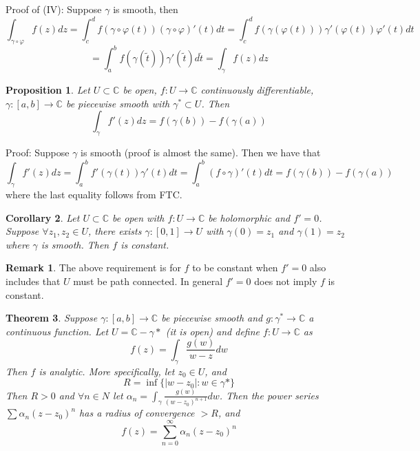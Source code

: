 \documentclass[11pt]{article}
\theoremstyle{plain}
\newtheorem{theorem}{Theorem}[section]
\newtheorem{corollary}[theorem]{Corollary}
\newtheorem{proposition}[theorem]{Proposition}
\theoremstyle{definition}
\newtheorem{remark}{Remark}
\newcommand{\C}{\mathbb{C}}
\begin{document}
Proof of (IV): Suppose $\gamma$ is smooth, then 
$$ \int_{\gamma \circ \varphi} f(z)dz = \int_{c}^d f(\gamma \circ \varphi(t)) (\gamma \circ \varphi)'(t)dt = \int_c^d f(\gamma(\varphi(t))) \gamma'(\varphi(t)) \varphi'(t)dt $$
$$ = \int_a^b f(\gamma(\tilde{t})) \gamma'(\tilde{t})d\tilde{t} = \int_{\gamma} f(z)dz $$

\begin{proposition}
Let $U \subset \mathbb{C}$ be open, $f: U \to \C$ continuously differentiable, $\gamma : [a, b] \to \C$ be piecewise smooth with $\gamma^* \subset U$. Then 
$$ \int_{\gamma} f'(z)dz = f(\gamma(b)) - f(\gamma(a)) $$
\end{proposition}

Proof: Suppose $\gamma$ is smooth (proof is almost the same). Then we have that 
$$ \int_{\gamma} f'(z)dz = \int_a^b f'(\gamma(t))\gamma'(t)dt = \int_a^b (f \circ \gamma)'(t) dt = f(\gamma(b)) - f(\gamma(a)) $$
where the last equality follows from FTC.

\begin{corollary}
Let $U \subset \C$ be open with $f: U \to \C$ be holomorphic and $f' = 0$. Suppose $\forall z_1, z_2 \in U$, there exists $\gamma :[0, 1] \to U$ with $\gamma(0) = z_1$ and $\gamma(1) = z_2$ where $\gamma$ is smooth. Then $f$ is constant.
\end{corollary}

\begin{remark}
The above requirement is for $f$ to be constant when $f' = 0$ also includes that $U$ must be path connected. In general $f' = 0$ does not imply $f$ is constant.
\end{remark}

\begin{theorem}
Suppose $\gamma:[a,b] \to \C$ be piecewise smooth and $g: \gamma^* \to \C$ a continuous function. Let $U = \C - \gamma*$ (it is open) and define $f: U \to \C$ as 
$$f(z) = \int_{\gamma} \frac{g(w)}{w- z} dw$$
Then $f$ is analytic. More specifically, let $z_0 \in U$, and 
$$R = \inf\{ |w - z_0| : w \in \gamma*\}$$
Then $R > 0$ and $\forall n \in N$ let $\alpha_n = \int_{\gamma} \frac{g(w)}{(w - z_0)^{n+1}} dw$. Then the power series $\sum \alpha_n(z - z_0)^n$ has a radius of convergence $> R$, and 
$$ f(z) = \sum_{n=0}^{\infty} \alpha_n (z - z_0)^n $$
\end{theorem}
\end{document}
